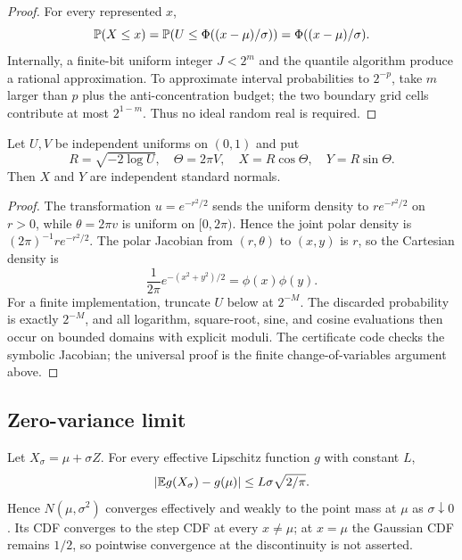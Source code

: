 \begin{proof}
For every represented $x$,
\[
 \mathbb P(X\le x)=\mathbb P\!\left(U\le\Phi((x-\mu)/\sigma)\right)
 =\Phi((x-\mu)/\sigma).
\]
Internally, a finite-bit uniform integer $J<2^m$ and the quantile algorithm produce a rational approximation.  To approximate interval probabilities to $2^{-p}$, take $m$ larger than $p$ plus the anti-concentration budget; the two boundary grid cells contribute at most $2^{1-m}$.  Thus no ideal random real is required.
\end{proof}

\begin{theorem}\label{thm:box-muller}
Let $U,V$ be independent uniforms on $(0,1)$ and put
\begin{equation}\label{eq:box-muller}
 R=\sqrt{-2\log U},
 \quad \Theta=2\pi V,
 \quad X=R\cos\Theta,
 \quad Y=R\sin\Theta.
\end{equation}
Then $X$ and $Y$ are independent standard normals.
\end{theorem}

\begin{proof}
The transformation $u=e^{-r^2/2}$ sends the uniform density to
$r e^{-r^2/2}$ on $r>0$, while $\theta=2\pi v$ is uniform on $[0,2\pi)$.  Hence the joint polar density is
$(2\pi)^{-1}r e^{-r^2/2}$.  The polar Jacobian from $(r,\theta)$ to $(x,y)$ is $r$, so the Cartesian density is
\[
 \frac1{2\pi}e^{-(x^2+y^2)/2}=\phi(x)\phi(y).
\]
For a finite implementation, truncate $U$ below at $2^{-M}$.  The discarded probability is exactly $2^{-M}$, and all logarithm, square-root, sine, and cosine evaluations then occur on bounded domains with explicit moduli.  The certificate code checks the symbolic Jacobian; the universal proof is the finite change-of-variables argument above.
\end{proof}

\subsection{Zero-variance limit}

\begin{theorem}\label{thm:zero-variance}
Let $X_\sigma=\mu+\sigma Z$.  For every effective Lipschitz function $g$ with constant $L$,
\begin{equation}\label{eq:weak-degenerate}
 |\mathbb E g(X_\sigma)-g(\mu)|
 \le L\sigma\sqrt{2/\pi}.
\end{equation}
Hence $N(\mu,\sigma^2)$ converges effectively and weakly to the point mass at $\mu$ as $\sigma\downarrow0$.  Its CDF converges to the step CDF at every $x\ne\mu$; at $x=\mu$ the Gaussian CDF remains $1/2$, so pointwise convergence at the discontinuity is not asserted.
\end{theorem}

